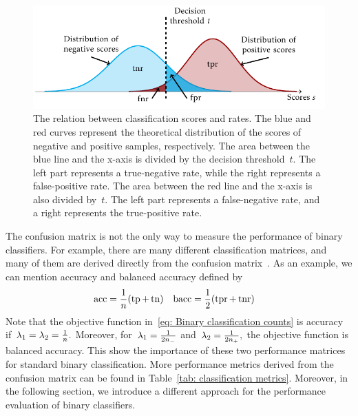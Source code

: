 \begin{figure}
  \centering
  \includegraphics{images/confusion_rates.pdf}
  \caption{The relation between classification scores and  rates. The blue and red curves represent the theoretical distribution of the scores of negative and positive samples, respectively. The area between the blue line and the x-axis is divided by the decision threshold~$t.$ The left part represents a true-negative rate, while the right represents a false-positive rate. The area between the red line and the x-axis is also divided by~$t.$ The left part represents a false-negative rate, and a right represents the true-positive rate.}
  \label{fig: scores and rates}
\end{figure}

The confusion matrix is not the only way to measure the performance of binary classifiers. For example, there are many different classification matrices, and many of them are derived directly from the confusion matrix~\cite{fawcett2006introduction, metz1978basic, brodersen2010balanced, hossin2015review}. As an example, we can mention accuracy and balanced accuracy defined by
\begin{align*}
  \accuracy & = \frac{1}{n}\Brac{\tp + \tn} &
  \baccuracy & = \frac{1}{2}\Brac{\tpr + \tnr}
\end{align*}
Note that the objective function in~\eqref{eq: Binary classification counts} is accuracy if~$\lambda_1 = \lambda_2 = \frac{1}{n}.$ Moreover, for~$\lambda_1 = \frac{1}{2n_{-}}$ and~$\lambda_2 = \frac{1}{2n_{+}},$ the objective function is balanced accuracy. This show the importance of these two performance matrices for standard binary classification. More performance metrics derived from the confusion matrix can be found in Table~\ref{tab: classification metrics}. Moreover, in the following section, we introduce a different approach for the performance evaluation of binary classifiers.

